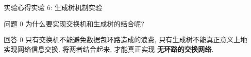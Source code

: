 \documentclass{beamer}
\begin{document}
\begin{frame}{实验心得}{实验 6: 生成树机制实验}
    \begin{block}{问题 0}
        为什么要实现交换机和生成树的结合呢?
    \end{block}
    \begin{alertblock}{回答 0}
        只有交换机不能避免数据包环路造成的浪费,
        只有生成树不能真正意义上地实现网络信息交换.
        将两者结合起来, 才能真正实现
        \textbf{无环路的交换网络}.
    \end{alertblock}
\end{frame}

\end{document}
